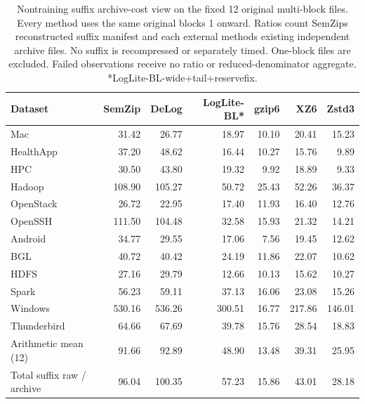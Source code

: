 \begin{table}[t]\centering\small
\caption{Nontraining suffix archive-cost view on the fixed 12 original multi-block files. Every method uses the same original blocks 1 onward. Ratios count SemZip\textquotesingle s reconstructed suffix manifest and each external method\textquotesingle s existing independent archive files. No suffix is recompressed or separately timed. One-block files are excluded. Failed observations receive no ratio or reduced-denominator aggregate. *LogLite-BL-wide+tail+reservefix.}
\label{tab:external-suffix}
\begin{tabular}{lrrrrrr}\toprule
Dataset & SemZip & DeLog & LogLite-BL* & gzip6 & XZ6 & Zstd3 \\ \midrule
Mac & 31.42 & 26.77 & 18.97 & 10.10 & 20.41 & 15.23 \\
HealthApp & 37.20 & 48.62 & 16.44 & 10.27 & 15.76 & 9.89 \\
HPC & 30.50 & 43.80 & 19.32 & 9.92 & 18.89 & 9.33 \\
Hadoop & 108.90 & 105.27 & 50.72 & 25.43 & 52.26 & 36.37 \\
OpenStack & 26.72 & 22.95 & 17.40 & 11.93 & 16.40 & 12.76 \\
OpenSSH & 111.50 & 104.48 & 32.58 & 15.93 & 21.32 & 14.21 \\
Android & 34.77 & 29.55 & 17.06 & 7.56 & 19.45 & 12.62 \\
BGL & 40.72 & 40.42 & 24.19 & 11.86 & 22.07 & 10.62 \\
HDFS & 27.16 & 29.79 & 12.66 & 10.13 & 15.62 & 10.27 \\
Spark & 56.23 & 59.11 & 37.13 & 16.06 & 23.08 & 15.26 \\
Windows & 530.16 & 536.26 & 300.51 & 16.77 & 217.86 & 146.01 \\
Thunderbird & 64.66 & 67.69 & 39.78 & 15.76 & 28.54 & 18.83 \\
Arithmetic mean (12) & 91.66 & 92.89 & 48.90 & 13.48 & 39.31 & 25.95 \\
Total suffix raw / archive & 96.04 & 100.35 & 57.23 & 15.86 & 43.01 & 28.18 \\
\bottomrule\end{tabular}\end{table}
